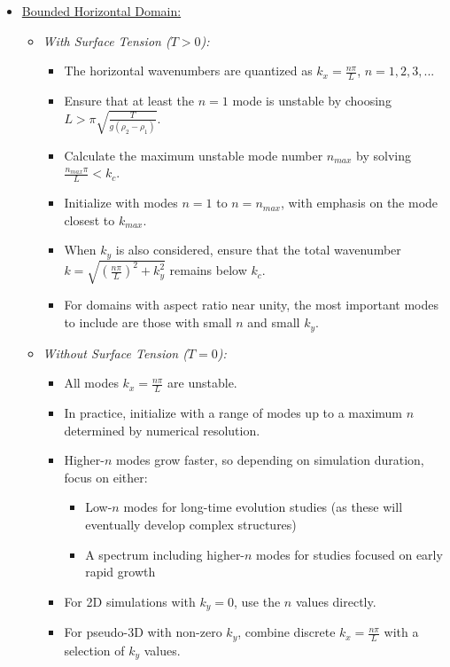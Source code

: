 \documentclass[12pt,a4paper]{article}
\begin{document}
\begin{enumerate}
\begin{itemize}
        \item \underline{Bounded Horizontal Domain:}
            \begin{itemize}
                \item \textit{With Surface Tension ($T > 0$):}
                \begin{itemize}
                    \item The horizontal wavenumbers are quantized as $k_x = \frac{n\pi}{L}$, $n = 1, 2, 3, ...$
                    \item Ensure that at least the $n=1$ mode is unstable by choosing $L > \pi\sqrt{\frac{T}{g(\rho_2-\rho_1)}}$.
                    \item Calculate the maximum unstable mode number $n_{max}$ by solving $\frac{n_{max}\pi}{L} < k_c$.
                    \item Initialize with modes $n = 1$ to $n = n_{max}$, with emphasis on the mode closest to $k_{max}$.
                    \item When $k_y$ is also considered, ensure that the total wavenumber $k = \sqrt{(\frac{n\pi}{L})^2 + k_y^2}$ remains below $k_c$.
                    \item For domains with aspect ratio near unity, the most important modes to include are those with small $n$ and small $k_y$.
                \end{itemize}
                \item \textit{Without Surface Tension ($T = 0$):}
                \begin{itemize}
                    \item All modes $k_x = \frac{n\pi}{L}$ are unstable.
                    \item In practice, initialize with a range of modes up to a maximum $n$ determined by numerical resolution.
                    \item Higher-$n$ modes grow faster, so depending on simulation duration, focus on either:
                    \begin{itemize}
                        \item Low-$n$ modes for long-time evolution studies (as these will eventually develop complex structures)
                        \item A spectrum including higher-$n$ modes for studies focused on early rapid growth
                    \end{itemize}
                    \item For 2D simulations with $k_y = 0$, use the $n$ values directly.
                    \item For pseudo-3D with non-zero $k_y$, combine discrete $k_x = \frac{n\pi}{L}$ with a selection of $k_y$ values.
                \end{itemize}
            \end{itemize}
            

\end{itemize}
\end{enumerate}
\end{document}
